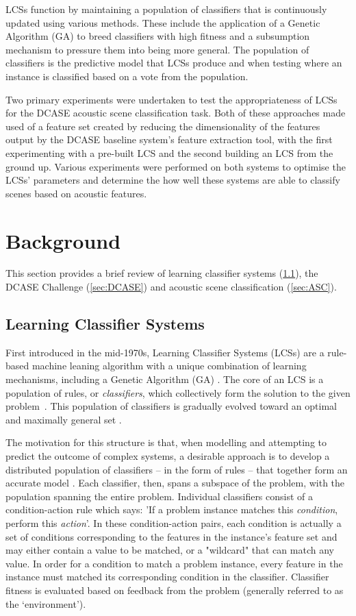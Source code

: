\documentclass[11pt]{article}
\begin{document}
LCSs function by maintaining a population of classifiers that is continuously updated using various methods. These include the application of a Genetic Algorithm (GA) to breed classifiers with high fitness and a subsumption mechanism to pressure them into being more general. The population of classifiers is the predictive model that LCSs produce and when testing where an instance is classified based on a vote from the population.

Two primary experiments were undertaken to test the appropriateness of LCSs for the DCASE acoustic scene classification task. Both of these approaches made used of a feature set created by reducing the dimensionality of the features output by the DCASE baseline system's feature extraction tool, with the first experimenting with a pre-built LCS and the second building an LCS from the ground up. Various experiments were performed on both systems to optimise the LCSs' parameters and determine the how well these systems are able to classify scenes based on acoustic features.

\section{Background}

This section provides a brief review of learning classifier systems (\ref{sec:LCS}), the DCASE Challenge (\ref{sec:DCASE}) and acoustic scene classification (\ref{sec:ASC}).

\subsection{Learning Classifier Systems}
\label{sec:LCS}

First introduced in the mid-1970s, Learning Classifier Systems (LCSs) are a rule-based machine leaning algorithm with a unique combination of learning mechanisms, including a Genetic Algorithm (GA) \cite{Butz2015}. The core of an LCS is a population of rules, or \textit{classifiers}, which collectively form the solution to the given problem~\cite{Urbanowicz2009}. This population of classifiers is gradually evolved toward an optimal and maximally general set \cite{Urbanowicz2009}.

The motivation for this structure is that, when modelling and attempting to predict the outcome of complex systems, a desirable approach is to develop a distributed population of classifiers -- in the form of rules -- that together form an accurate model \cite[p.~2]{Urbanowicz2009}. Each classifier, then, spans a subspace of the problem, with the population spanning the entire problem. Individual classifiers consist of a condition-action rule which says: 'If a problem instance matches this \textit{condition}, perform this \textit{action}'. In these condition-action pairs, each condition is actually a set of conditions corresponding to the features in the instance's feature set and may either contain a value to be matched, or a "wildcard" that can match any value. In order for a condition to match a problem instance, every feature in the instance must matched its corresponding condition in the classifier. Classifier fitness is evaluated based on feedback from the problem (generally referred to as the `environment').
\end{document}
